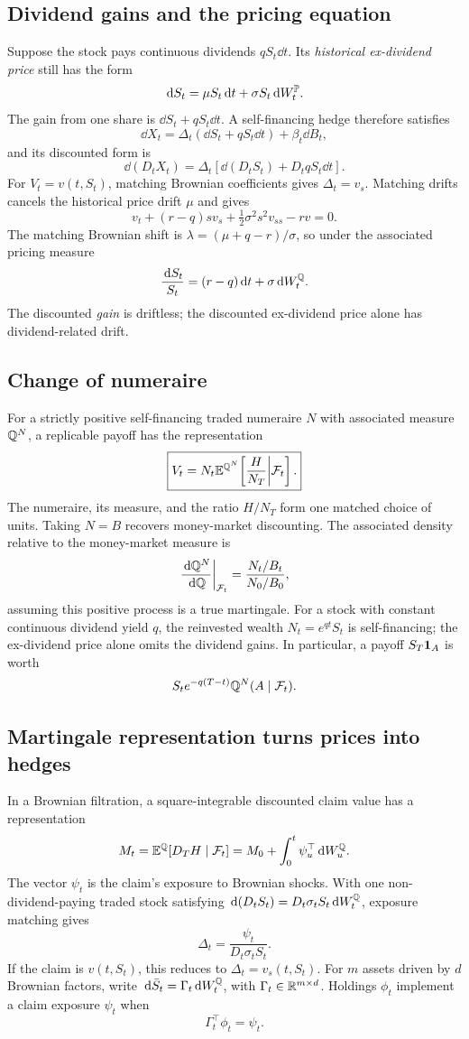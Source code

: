 \subsection{Dividend gains and the pricing equation}

Suppose the stock pays continuous dividends \(qS_t\dd t\).
Its \emph{historical ex-dividend price} still has the form
\[
\,\mathrm{d} S_t=\mu S_t\,\mathrm{d} t+\sigma S_t\,\mathrm{d} W_t^{\mathbb{P}}.
\]
The gain from one share is \(\dd S_t+qS_t\dd t\). A
self-financing hedge therefore satisfies
\[
\boxed{
\dd X_t=\Delta_t(\dd S_t+qS_t\dd t)+\beta_t\dd B_t,}
\]
and its discounted form is
\[
\dd(D_tX_t)=\Delta_t\left[
\dd(D_tS_t)+D_tqS_t\dd t\right].
\]
For \(V_t=v(t,S_t)\), matching Brownian coefficients gives
\(\Delta_t=v_s\). Matching drifts cancels the historical price
drift \(\mu\) and gives
\[
\boxed{
v_t+(r-q)sv_s+\tfrac12\sigma^2s^2v_{ss}-rv=0.}
\]
The matching Brownian shift is
\(\lambda=(\mu+q-r)/\sigma\), so under the associated pricing measure
\[
\frac{\,\mathrm{d} S_t}{S_t}=(r-q)\,\mathrm{d} t+\sigma\,\mathrm{d} W_t^{\mathbb{Q}}.
\]
The discounted \emph{gain} is driftless; the discounted
ex-dividend price alone has dividend-related drift.

\subsection{Change of numeraire}

For a strictly positive self-financing traded numeraire \(N\) with associated measure
\(\mathbb{Q}^N\), a replicable payoff has the representation
\[
\boxed{
V_t=N_t\mathbb{E}^{\mathbb{Q}^N}\!\left[\frac{H}{N_T}\middle|\mathcal{F}_t\right].}
\]
The numeraire, its measure, and the ratio \(H/N_T\) form one matched
choice of units. Taking \(N=B\) recovers money-market discounting.
The associated density relative to the money-market measure is
\[
\left.\frac{\,\mathrm{d}\mathbb{Q}^N}{\,\mathrm{d}\mathbb{Q}}\right|_{\mathcal{F}_t}
=\frac{N_t/B_t}{N_0/B_0},
\]
assuming this positive process is a true martingale. For a stock with
constant continuous dividend yield \(q\), the reinvested wealth
\(N_t=e^{qt}S_t\) is self-financing; the ex-dividend price alone omits
the dividend gains. In particular, a payoff \(S_T\mathbf{1}_A\) is worth
\[
S_t e^{-q(T-t)}\mathbb{Q}^N(A\mid\mathcal{F}_t).
\]

\subsection{Martingale representation turns prices into hedges}

In a Brownian filtration, a square-integrable discounted claim value
has a representation
\[
M_t=\mathbb{E}^{\mathbb{Q}}[D_TH\mid\mathcal{F}_t]
=M_0+\int_0^t\psi_u^\top\,\mathrm{d} W_u^{\mathbb{Q}}.
\]
The vector \(\psi_t\) is the claim's exposure to Brownian shocks. With
one non-dividend-paying traded stock satisfying
\(\,\mathrm{d}(D_tS_t)=D_t\sigma_tS_t\,\mathrm{d} W_t^{\mathbb{Q}}\), exposure matching gives
\[
\boxed{\Delta_t=\frac{\psi_t}{D_t\sigma_tS_t}.}
\]
If the claim is \(v(t,S_t)\), this reduces to \(\Delta_t=v_s(t,S_t)\).
For \(m\) assets driven by \(d\) Brownian factors, write
\(\,\mathrm{d}\bar S_t=\Gamma_t\,\mathrm{d} W_t^{\mathbb{Q}}\), with
\(\Gamma_t\in\mathbb{R}^{m\times d}\). Holdings \(\phi_t\) implement a
claim exposure \(\psi_t\) when
\[
\boxed{\Gamma_t^\top\phi_t=\psi_t.}
\]

